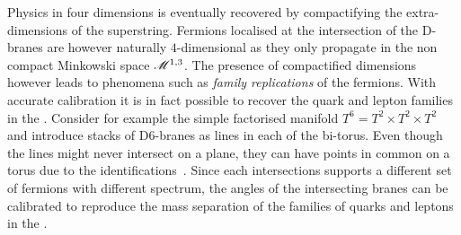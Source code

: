 Physics in four dimensions is eventually recovered by compactifying the extra-dimensions of the superstring.\footnotemark{}
Fermions localised at the intersection of the D-branes are however naturally $4$-dimensional as they only propagate in the non compact Minkowski space $\mathscr{M}^{1,3}$.
The presence of compactified dimensions however leads to phenomena such as \emph{family replications} of the fermions.
With accurate calibration it is in fact possible to recover the quark and lepton families in the \sm.
Consider for example the simple \cy factorised manifold $T^6 = T^2 \times T^2 \times T^2$ and introduce stacks of D6-branes as lines in each of the bi-torus.
Even though the lines might never intersect on a plane, they can have points in common on a torus due to the identifications~\cite{Zwiebach:2009:FirstCourseString}.
Since each intersections supports a different set of fermions with different spectrum, the angles of the intersecting branes can be calibrated to reproduce the mass separation of the families of quarks and leptons in the \sm.


